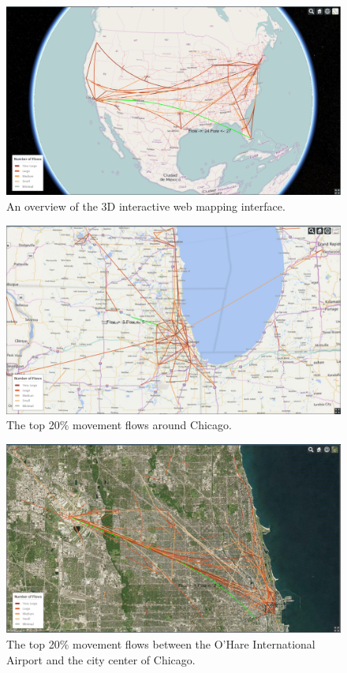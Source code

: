 \documentclass[ijgi,article,accept,moreauthors,pdftex,10pt,a4paper]{mdpi}
\theoremstyle{mdpi}
\newcounter{re}
\theoremstyle{mdpidefinition}
\begin{document}
\begin{figure}[ht]
\centering
\includegraphics[width=0.8\linewidth]{./figures/all}
\caption{An overview of the 3D interactive web mapping interface.}
\label{fig:Web_Interface}
\end{figure}
\FloatBarrier

\begin{figure}[ht]
\centering
\includegraphics[width=0.8\linewidth]{./figures/Chicago}
\caption{The top 20$\%$ movement flows around Chicago.}
\label{fig:chicago}
\end{figure}
\FloatBarrier

\begin{figure}[ht]
\centering
\includegraphics[width=0.8\linewidth]{./figures/Chicago_airport}
\caption{The top 20$\%$ movement flows between the O'Hare International Airport and the city center of Chicago.}
\label{fig:Chicago_airport}
\end{figure}
\FloatBarrier
\end{document}
